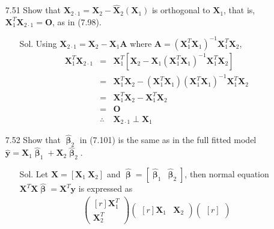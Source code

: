 \documentclass[12pt]{article} %
\begin{document}
\begin{enumerate}
\begin{enumerate}
$$        $$
  \end{enumerate}
  \item[7.51] Show that $\mathbf{X}_{2\cdot 1}=\mathbf{X}_{2}-\mathbf{\hat{X}}_{2}(\mathbf{X}_{1})$ is 
  orthogonal to $\mathbf{X}_{1}$, that is, $\mathbf{X}^{T}_{1}\mathbf{X}_{2\cdot 1}=\mathbf{O}$, as in (7.98).
  	\begin{enumerate}
  	  \item[Sol.] Using $\mathbf{X}_{2\cdot
  	  1}=\mathbf{X}_{2}-\mathbf{X}_{1}\mathbf{A}$
  	  where
  	  $\mathbf{A}=(\mathbf{X}_{1}^{T}\mathbf{X}_{1})^{-1}\mathbf{X}_{1}^{T}\mathbf{X}_{2}$,
  	  \begin{eqnarray*}
  	   \mathbf{X}_{1}^{T}\mathbf{X}_{2\cdot 1}&=&\mathbf{X}_{1}^{T}
  	   [\mathbf{X}_{2}-\mathbf{X}_{1}(\mathbf{X}_{1}^{T}\mathbf{X}_{1})^{-1}\mathbf{X}_{1}^{T}\mathbf{X}_{2}]\\
  	   &=&
  	   \mathbf{X}_{1}^{T}\mathbf{X}_{2}-(\mathbf{X}_{1}^{T}\mathbf{X}_{1})
  	   (\mathbf{X}_{1}^{T}\mathbf{X}_{1})^{-1}\mathbf{X}_{1}^{T}\mathbf{X}_{2}\\
  	   &=&
  	   \mathbf{X}_{1}^{T}\mathbf{X}_{2}-\mathbf{X}_{1}^{T}\mathbf{X}_{2}\\
  	   &=&
  	   \mathbf{O}\\  	   
  	   &\therefore& \mathbf{X}_{2\cdot 1} \perp \mathbf{X}_{1} 
  	  \end{eqnarray*}  	    	  
  	  \end{enumerate}
  \item[7.52] Show that $\pmb{\hat{\upbeta}}_{2}$ in (7.101) is the same as in the full fitted model
  $\mathbf{\hat{y}}=\mathbf{X}_{1}\pmb{\hat{\upbeta}}_{1}+\mathbf{X}_{2}\pmb{\hat{\upbeta}}_{2}$.
  	\begin{enumerate}
  	  \item[Sol.] Let $\mathbf{X}=[\mathbf{X}_{1}~\mathbf{X}_{2}]$ and
  	  $\hat{\pmb{\upbeta}}=[\hat{\pmb{\upbeta}}_{1}~\hat{\pmb{\upbeta}}_{2}]$,
  	  then normal equation 
 	  $\mathbf{X}^{T}\mathbf{X}\hat{\pmb{\upbeta}}=\mathbf{X}^{T}\mathbf{y}$ is
 	  expressed as 
 	  \begin{eqnarray*}
 	  	\begin{pmatrix}[r]
 	  	 \mathbf{X}_{1}^{T} \\
 	  	 \mathbf{X}_{2}^{T}
 	  	\end{pmatrix}
 	  	\begin{pmatrix}[r]
 	  	 \mathbf{X}_{1} & \mathbf{X}_{2} 
 	  	\end{pmatrix}
 	  	\begin{pmatrix}[r]

\end{pmatrix}
\end{eqnarray*}
\end{enumerate}
\end{enumerate}
\end{document}
